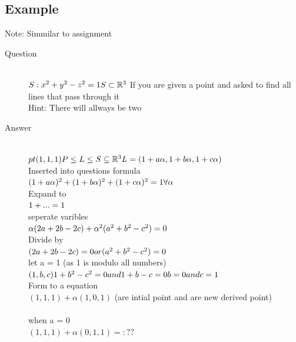 \documentclass[11pt,twoside,a4paper]{article}
\begin{document}
    \subsection{Example}
      Note: Simmilar to assignment
      \begin{description}
        \item[Question] \hfill \\
          \(
            S:x^2+y^2-z^2=1 \\
            S\subset\mathbb{R}^3 \\
          \)
          If you are given a point and asked to find all lines that pass through it\\
          Hint: There will allways be two
        
        \item[Answer] \hfill \\
          \(
            pt(1,1,1) \\*
            P \leq L \leq S \subseteq \mathbb{R}^3 \\
            L = (1+a\alpha, 1+b\alpha, 1+c\alpha) \\
          \)
            \\ Inserted into questions formula \\
          \(
            (1+a\alpha)^2 + (1+b\alpha)^2 + (1+c\alpha)^2 = 1  \forall \alpha \\
          \)
            \\ Expand to\\
          \(
            1+ ... = 1 \\
          \)
            \\ seperate varibles \\
          \(
            \alpha(2a+2b-2c)+\alpha^2(a^2+b^2-c^2) = 0 \\
          \)
            \\ Divide by \alpha \\
          \(
            (2a+2b-2c) = 0 or (a^2+b^2-c^2) = 0 \\
          \)
            \\ let a = 1 (as 1 is modulo all numbers) \\
          \(
            (1,b,c) \\
            1+b^2-c^2 = 0 and 1+b-c=0 \\
            b=0 and c=1 \\
          \)
            \\ Form to a equation \\
          \(
            (1,1,1) + \alpha(1,0,1) \) (are intial point and are new derived point) \\
          
            \\ when a = 0 \\
          \(
            (1,1,1) + \alpha(0,1,1) = :??
          \)
      \end{description}
  \clearpage
  
\end{document}

